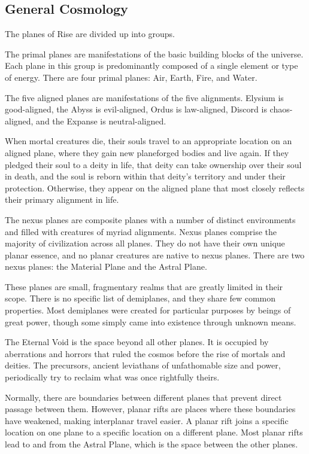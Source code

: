   \subsection{General Cosmology}
    The planes of Rise are divided up into groups.

     The primal planes are manifestations of the basic building blocks of the universe.
    Each plane in this group is predominantly composed of a single element or type of energy.
    There are four primal planes: Air, Earth, Fire, and Water.

     The five aligned planes are manifestations of the five alignments.
    Elysium is good-aligned, the Abyss is evil-aligned, Ordus is law-aligned, Discord is chaos-aligned, and the Expanse is neutral-aligned.

    When mortal creatures die, their souls travel to an appropriate location on an aligned plane, where they gain new planeforged bodies and live again.
    If they pledged their soul to a deity in life, that deity can take ownership over their soul in death, and the soul is reborn within that deity's territory and under their protection.
    Otherwise, they appear on the aligned plane that most closely reflects their primary alignment in life.

     The nexus planes are composite planes with a number of distinct environments and filled with creatures of myriad alignments.
    Nexus planes comprise the majority of civilization across all planes.
    They do not have their own unique planar essence, and no planar creatures are native to nexus planes.
    There are two nexus planes: the Material Plane and the Astral Plane.

     These planes are small, fragmentary realms that are greatly limited in their scope.
    There is no specific list of demiplanes, and they share few common properties.
    Most demiplanes were created for particular purposes by beings of great power, though some simply came into existence through unknown means.

     The Eternal Void is the space beyond all other planes.
    It is occupied by aberrations and horrors that ruled the cosmos before the rise of mortals and deities.
    The precursors, ancient leviathans of unfathomable size and power, periodically try to reclaim what was once rightfully theirs.

  \label{Planar Rifts}
    Normally, there are boundaries between different planes that prevent direct passage between them.
    However, planar rifts are places where these boundaries have weakened, making interplanar travel easier.
    A planar rift joins a specific location on one plane to a specific location on a different plane.
    Most planar rifts lead to and from the Astral Plane, which is the space between the other planes.

